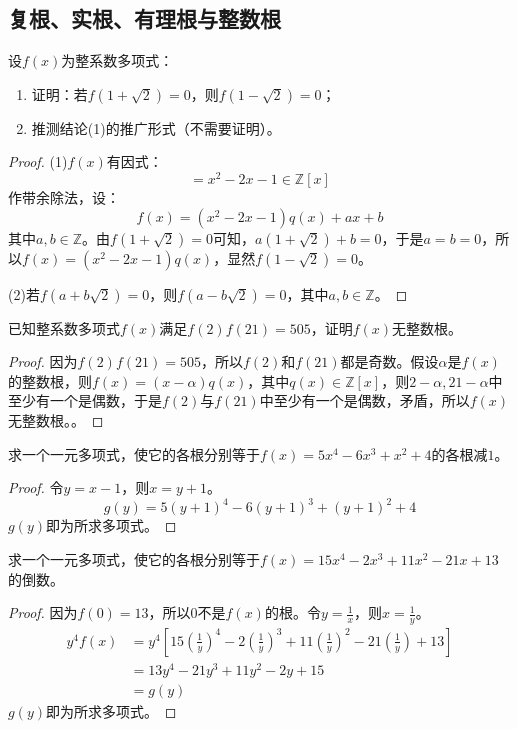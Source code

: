 \subsection{复根、实根、有理根与整数根}
\begin{theorem}
	设$f(x)$为整系数多项式：
	\begin{enumerate}
		\item 证明：若$f(1+\sqrt{2})=0$，则$f(1-\sqrt{2})=0$；
		\item 推测结论(1)的推广形式（不需要证明）。
	\end{enumerate}
\end{theorem}
\begin{proof}
	(1)$f(x)$有因式：
	\begin{equation*}
		[x-(1+\sqrt{2})][x-(1-\sqrt{2})]=x^2-2x-1\in\mathbb{Z}[x]
	\end{equation*}
	作带余除法，设：
	\begin{equation*}
		f(x)=(x^2-2x-1)q(x)+ax+b
	\end{equation*}
	其中$a,b\in\mathbb{Z}$。由$f(1+\sqrt{2})=0$可知，$a(1+\sqrt{2})+b=0$，于是$a=b=0$，所以$f(x)=(x^2-2x-1)q(x)$，显然$f(1-\sqrt{2})=0$。\par
	(2)若$f(a+b\sqrt{2})=0$，则$f(a-b\sqrt{2})=0$，其中$a,b\in\mathbb{Z}$。
\end{proof}
\begin{theorem}
	已知整系数多项式$f(x)$满足$f(2)f(21)=505$，证明$f(x)$无整数根。
\end{theorem}
\begin{proof}
	因为$f(2)f(21)=505$，所以$f(2)$和$f(21)$都是奇数。假设$\alpha$是$f(x)$的整数根，则$f(x)=(x-\alpha)q(x)$，其中$q(x)\in\mathbb{Z}[x]$，则$2-\alpha,21-\alpha$中至少有一个是偶数，于是$f(2)$与$f(21)$中至少有一个是偶数，矛盾，所以$f(x)$无整数根。。
\end{proof}
\begin{theorem}
	求一个一元多项式，使它的各根分别等于$f(x)=5x^4-6x^3+x^2+4$的各根减$1$。
\end{theorem}
\begin{proof}
	令$y=x-1$，则$x=y+1$。
	\begin{equation*}
		g(y)=5(y+1)^4-6(y+1)^3+(y+1)^2+4
	\end{equation*}
	$g(y)$即为所求多项式。
\end{proof}
\begin{theorem}
	求一个一元多项式，使它的各根分别等于$f(x)=15x^4-2x^3+11x^2-21x+13$的倒数。
\end{theorem}
\begin{proof}
	因为$f(0)=13$，所以$0$不是$f(x)$的根。令$y=\frac{1}{x}$，则$x=\frac{1}{y}$。
	\begin{align*}
		y^4f(x)
		&=y^4\left[15\left(\frac{1}{y}\right)^4-2\left(\frac{1}{y}\right)^3+11\left(\frac{1}{y}\right)^2-21\left(\frac{1}{y}\right)+13\right] \\
		&=13y^4-21y^3+11y^2-2y+15 \\
		&=g(y)
	\end{align*}
	$g(y)$即为所求多项式。
\end{proof}
